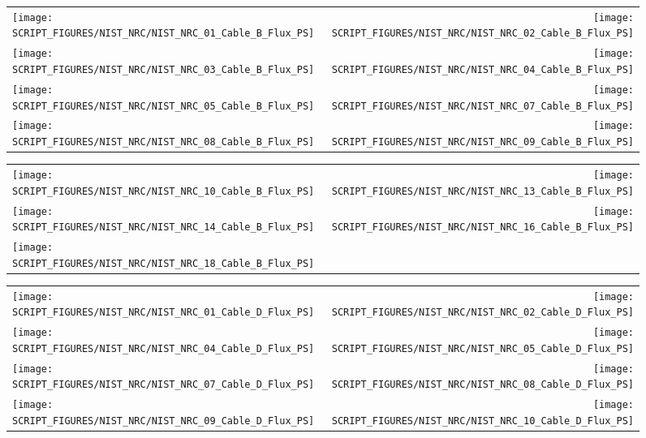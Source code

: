 \begin{figure}[!ht]
\begin{tabular*}{\textwidth}{l@{\extracolsep{\fill}}r}
\texttt{[image: SCRIPT\_FIGURES/NIST\_NRC/NIST\_NRC\_01\_Cable\_B\_Flux\_PS]} &
\texttt{[image: SCRIPT\_FIGURES/NIST\_NRC/NIST\_NRC\_02\_Cable\_B\_Flux\_PS]} \\
\texttt{[image: SCRIPT\_FIGURES/NIST\_NRC/NIST\_NRC\_03\_Cable\_B\_Flux\_PS]} &
\texttt{[image: SCRIPT\_FIGURES/NIST\_NRC/NIST\_NRC\_04\_Cable\_B\_Flux\_PS]} \\
\texttt{[image: SCRIPT\_FIGURES/NIST\_NRC/NIST\_NRC\_05\_Cable\_B\_Flux\_PS]} &
\texttt{[image: SCRIPT\_FIGURES/NIST\_NRC/NIST\_NRC\_07\_Cable\_B\_Flux\_PS]} \\
\texttt{[image: SCRIPT\_FIGURES/NIST\_NRC/NIST\_NRC\_08\_Cable\_B\_Flux\_PS]} &
\texttt{[image: SCRIPT\_FIGURES/NIST\_NRC/NIST\_NRC\_09\_Cable\_B\_Flux\_PS]}
\end{tabular*}
\end{figure}

\begin{figure}[!ht]
\begin{tabular*}{\textwidth}{l@{\extracolsep{\fill}}r}
\texttt{[image: SCRIPT\_FIGURES/NIST\_NRC/NIST\_NRC\_10\_Cable\_B\_Flux\_PS]} &
\texttt{[image: SCRIPT\_FIGURES/NIST\_NRC/NIST\_NRC\_13\_Cable\_B\_Flux\_PS]} \\
\texttt{[image: SCRIPT\_FIGURES/NIST\_NRC/NIST\_NRC\_14\_Cable\_B\_Flux\_PS]} &
\texttt{[image: SCRIPT\_FIGURES/NIST\_NRC/NIST\_NRC\_16\_Cable\_B\_Flux\_PS]} \\
\texttt{[image: SCRIPT\_FIGURES/NIST\_NRC/NIST\_NRC\_18\_Cable\_B\_Flux\_PS]}
\end{tabular*}
\end{figure}

\begin{figure}[!ht]
\begin{tabular*}{\textwidth}{l@{\extracolsep{\fill}}r}
\texttt{[image: SCRIPT\_FIGURES/NIST\_NRC/NIST\_NRC\_01\_Cable\_D\_Flux\_PS]} &
\texttt{[image: SCRIPT\_FIGURES/NIST\_NRC/NIST\_NRC\_02\_Cable\_D\_Flux\_PS]} \\
\texttt{[image: SCRIPT\_FIGURES/NIST\_NRC/NIST\_NRC\_04\_Cable\_D\_Flux\_PS]} &
\texttt{[image: SCRIPT\_FIGURES/NIST\_NRC/NIST\_NRC\_05\_Cable\_D\_Flux\_PS]} \\
\texttt{[image: SCRIPT\_FIGURES/NIST\_NRC/NIST\_NRC\_07\_Cable\_D\_Flux\_PS]} &
\texttt{[image: SCRIPT\_FIGURES/NIST\_NRC/NIST\_NRC\_08\_Cable\_D\_Flux\_PS]} \\
\texttt{[image: SCRIPT\_FIGURES/NIST\_NRC/NIST\_NRC\_09\_Cable\_D\_Flux\_PS]} &
\texttt{[image: SCRIPT\_FIGURES/NIST\_NRC/NIST\_NRC\_10\_Cable\_D\_Flux\_PS]}
\end{tabular*}
\end{figure}

